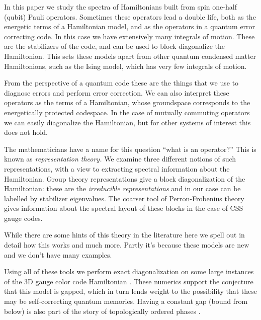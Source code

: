 \documentclass[11pt,oneside]{article}
\begin{document}
In this paper we study the spectra of 
Hamiltonians built from spin one-half (qubit) Pauli operators.
Sometimes these operators lead a double life,
both as the energetic terms of a Hamiltonian model, and as
the operators in a quantum error correcting code.
In this case we have
extensively many integrals of motion.
These are the stabilizers of the code,
and can be used to block diagonalize the Hamiltonion.
This sets these models apart from other 
quantum condensed matter Hamiltonions, such as
the Ising model, which has very few integrals of motion.

From the perspective of a quantum code these are the
things that we use to diagnose errors and perform error correction.
We can also interpret these operators as the terms of a Hamiltonian, whose
groundspace corresponds to the energetically protected codespace.
In the case of mutually commuting operators we can easily diagonalize the
Hamiltonian, but for other systems of interest this does not hold.

The mathematicians have a name for this question ``what is an operator?''
This is known as \emph{representation theory.}
We examine three different notions of
such representations, with a view to extracting
spectral information about the Hamiltonian.
Group theory representations give 
a block diagonalization of the Hamiltonian:
these are the \emph{irreducible representations} and in
our case can be labelled by stabilizer eigenvalues.
The coarser tool of Perron-Frobenius theory \cite{Perron1907, Frobenius1912, Baez2012}
gives information about the
spectral layout of these blocks in the case of CSS gauge codes.

While there are
some hints of this theory in the literature 
\cite{Bacon2006quantum,Yoshida2010} %
here we spell out in detail how this works and much more.
Partly it's because these models are new and we don't have
many examples.

Using all of these tools we 
perform exact diagonalization on some 
large instances of the 3D gauge color code 
Hamiltonian \cite{Bombin2015,Bombin2015single,Kubica2015}.
These numerics support the conjecture that this model is gapped,
which in turn lends weight to the possibility that these may
be self-correcting quantum memories.
Having a constant gap (bound from below)
is also part of the story of topologically ordered phases
\cite{Kitaev2003,Brown2016}.
\end{document}
